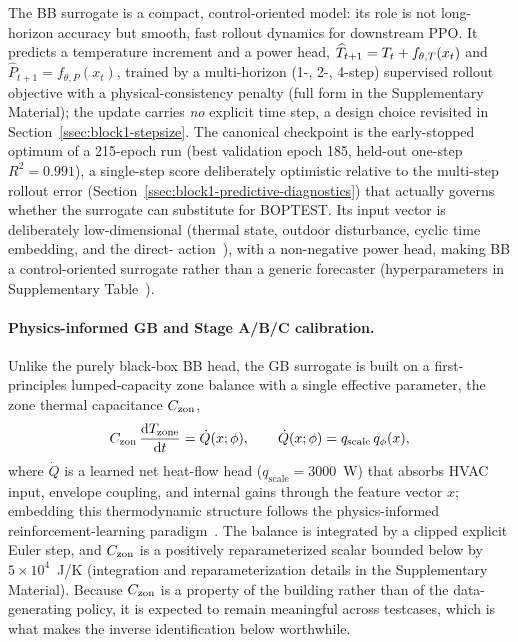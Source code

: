 The BB surrogate is a compact, control-oriented model: its role is not long-horizon accuracy but smooth, fast rollout dynamics for downstream PPO. It predicts a temperature increment and a power head, \(\widehat{T}_{t+1}=T_t+f_{\theta,T}(x_t)\) and \(\widehat{P}_{t+1}=f_{\theta,P}(x_t)\), trained by a multi-horizon (1-, 2-, 4-step) supervised rollout objective with a physical-consistency penalty (full form in the Supplementary Material); the update carries \emph{no} explicit time step, a design choice revisited in Section~\ref{ssec:block1-stepsize}. The canonical checkpoint is the early-stopped optimum of a 215-epoch run (best validation epoch 185, held-out one-step \(R^2=0.991\)), a single-step score deliberately optimistic relative to the multi-step rollout error (Section~\ref{ssec:block1-predictive-diagnostics}) that actually governs whether the surrogate can substitute for BOPTEST. Its input vector is deliberately low-dimensional (thermal state, outdoor disturbance, cyclic time embedding, and the direct-\Tsupply{} action~\citep{Sun2024DirectTSup}), with a non-negative power head, making BB a control-oriented surrogate rather than a generic forecaster (hyperparameters in Supplementary Table~).
















\paragraph{Physics-informed GB and Stage A/B/C calibration.}
\label{ssec:block1-BB5-calibration}

Unlike the purely black-box BB head, the GB surrogate is built on a first-principles lumped-capacity zone balance with a single effective parameter, the zone thermal capacitance \(C_{\mathrm{zon}}\),
\begin{equation}
 C_{\mathrm{zon}}\,\frac{\mathrm{d}T_{\mathrm{zone}}}{\mathrm{d}t} = \dot{Q}(x;\phi),
 \qquad \dot{Q}(x;\phi)=q_{\mathrm{scale}}\,q_\phi(x),
 \label{eq:rc-ode}
\end{equation}
where \(\dot{Q}\) is a learned net heat-flow head (\(q_{\mathrm{scale}}=3000\)~W) that absorbs HVAC input, envelope coupling, and internal gains through the feature vector \(x\); embedding this thermodynamic structure follows the physics-informed reinforcement-learning paradigm~\citep{Hedayat2025PINN}. The balance is integrated by a clipped explicit Euler step, and \(C_{\mathrm{zon}}\) is a positively reparameterized scalar bounded below by \(5\times10^4\)~J/K (integration and reparameterization details in the Supplementary Material). Because \(C_{\mathrm{zon}}\) is a property of the building rather than of the data-generating policy, it is expected to remain meaningful across testcases, which is what makes the inverse identification below worthwhile.

